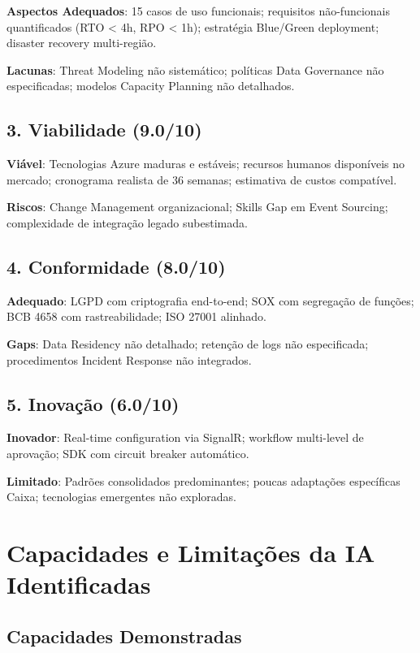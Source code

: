 \textbf{Aspectos Adequados}: 15 casos de uso funcionais; requisitos não-funcionais quantificados (RTO < 4h, RPO < 1h); estratégia Blue/Green deployment; disaster recovery multi-região.

\textbf{Lacunas}: Threat Modeling não sistemático; políticas Data Governance não especificadas; modelos Capacity Planning não detalhados.

\subsection{3. Viabilidade (9.0/10)}

\textbf{Viável}: Tecnologias Azure maduras e estáveis; recursos humanos disponíveis no mercado; cronograma realista de 36 semanas; estimativa de custos compatível.

\textbf{Riscos}: Change Management organizacional; Skills Gap em Event Sourcing; complexidade de integração legado subestimada.

\subsection{4. Conformidade (8.0/10)}

\textbf{Adequado}: LGPD com criptografia end-to-end; SOX com segregação de funções; BCB 4658 com rastreabilidade; ISO 27001 alinhado.

\textbf{Gaps}: Data Residency não detalhado; retenção de logs não especificada; procedimentos Incident Response não integrados.

\subsection{5. Inovação (6.0/10)}

\textbf{Inovador}: Real-time configuration via SignalR; workflow multi-level de aprovação; SDK com circuit breaker automático.

\textbf{Limitado}: Padrões consolidados predominantes; poucas adaptações específicas Caixa; tecnologias emergentes não exploradas.

\section{Capacidades e Limitações da IA Identificadas}

\subsection{Capacidades Demonstradas}

